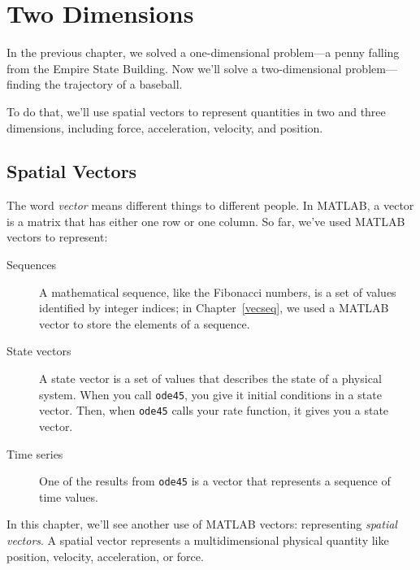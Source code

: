 \chapter{Two Dimensions}

In the previous chapter, we solved a one-dimensional problem---a penny falling from the Empire State Building.  Now we'll solve a two-dimensional problem---finding the trajectory of a baseball.


To do that, we'll use spatial vectors to represent quantities in two and three dimensions, including force, acceleration, velocity, and position.

\section{Spatial Vectors}
\label{spacial}

The word \emph{vector} means different
things to different people.  In MATLAB, a vector is a matrix that has
either one row or one column.  So far, we've used MATLAB vectors to
represent:

\begin{description}

\item[Sequences] A mathematical sequence, like the Fibonacci numbers, is a set of values identified by integer indices; in Chapter~\ref{vecseq}, we used a MATLAB vector to store the elements of a sequence. 

\item[State vectors] A state vector is a set of values that
describes the state of a physical system.  When you call
\lstinline{ode45}, you give it initial conditions in a state
vector.  Then, when \lstinline{ode45} calls your rate function, it
gives you a state vector.

\item[Time series] One of the results from \lstinline{ode45} is a vector that represents a sequence of time values.

\end{description}


In this chapter, we'll see another use of MATLAB vectors: representing
\emph{spatial vectors}.  A spatial vector represents a multidimensional physical quantity like position, velocity, acceleration, or force.

